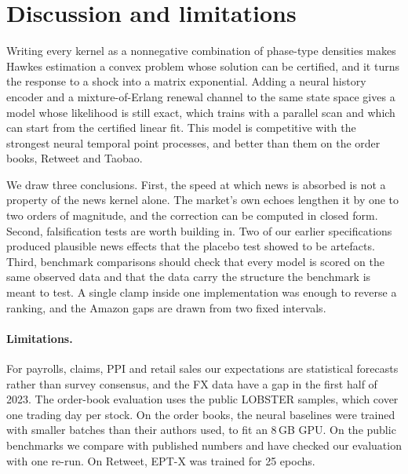 \section{Discussion and limitations}\label{sec:discussion}

Writing every kernel as a nonnegative combination of phase-type densities makes Hawkes estimation
a convex problem whose solution can be certified, and it turns the response to a shock into a
matrix exponential. Adding a neural history encoder and a mixture-of-Erlang renewal channel to the
same state space gives a model whose likelihood is still exact, which trains with a parallel scan
and which can start from the certified linear fit. This model is competitive with the strongest
neural temporal point processes, and better than them on the order books, Retweet and Taobao.

We draw three conclusions. First, the speed at which news is absorbed is not a property of the
news kernel alone. The market's own echoes lengthen it by one to two orders of magnitude, and the
correction can be computed in closed form. Second, falsification tests are worth building in. Two
of our earlier specifications produced plausible news effects that the placebo test showed to be
artefacts. Third, benchmark comparisons should check that every model is scored on the same
observed data and that the data carry the structure the benchmark is meant to test. A single clamp
inside one implementation was enough to reverse a ranking, and the Amazon gaps are drawn from two
fixed intervals.

\paragraph{Limitations.} For payrolls, claims, PPI and retail sales our expectations are
statistical forecasts rather than survey consensus, and the FX data have a gap in the first half
of 2023. The order-book evaluation uses the public LOBSTER samples, which cover one trading day per
stock. On the order books, the neural baselines were trained with smaller batches than their
authors used, to fit an 8\,GB GPU. On the public benchmarks we compare with published numbers and
have checked our evaluation with one re-run. On Retweet, EPT-X was trained for 25 epochs.

